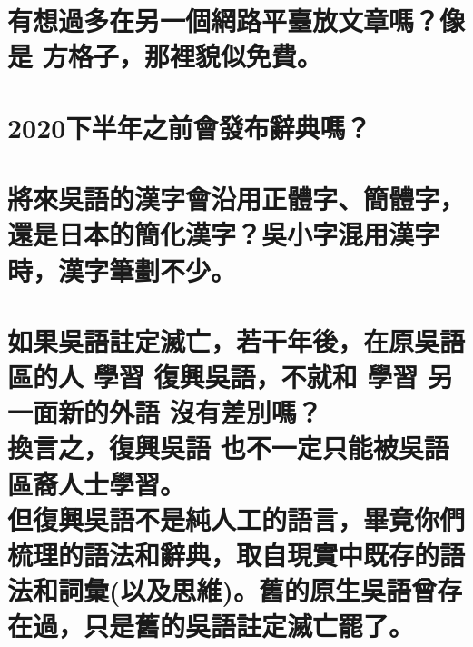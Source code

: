 \chapter[有想過多在另一個網路平臺放文章嗎？像是 方格子，那裡貌似免費。]{有想過多在另一個網路平臺放文章嗎？像是 方格子，那裡貌似免費。}

\chapter[2020下半年之前會發布辭典嗎？]{2020下半年之前會發布辭典嗎？}

\chapter[將來吳語的漢字會沿用正體字、簡體字，還是日本的簡化漢字？吳小字混用漢字時，漢字筆劃不少。]{將來吳語的漢字會沿用正體字、簡體字，還是日本的簡化漢字？吳小字混用漢字時，漢字筆劃不少。}

\chapter[如果吳語註定滅亡，若干年後，在原吳語區的人 學習 復興吳語，不就和 學習 另一面新的外語 沒有差別嗎？ 換言之，復興吳語 也不一定只能被吳語區裔人士學習。 但復興吳語不是純人工的語言，畢竟你們梳理的語法和辭典，取自現實中既存的語法和詞彙(以及思維)。舊的原生吳語曾存在過，只是舊的吳語註定滅亡罷了。]{如果吳語註定滅亡，若干年後，在原吳語區的人 學習 復興吳語，不就和 學習 另一面新的外語 沒有差別嗎？ \\[0.35em] 換言之，復興吳語 也不一定只能被吳語區裔人士學習。 \\[0.35em] 但復興吳語不是純人工的語言，畢竟你們梳理的語法和辭典，取自現實中既存的語法和詞彙(以及思維)。舊的原生吳語曾存在過，只是舊的吳語註定滅亡罷了。}

